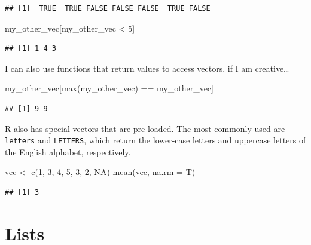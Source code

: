 \documentclass[
]{book}
\newenvironment{Shaded}{\begin{snugshade}}{\end{snugshade}}
\newcommand{\AttributeTok}[1]{\textcolor[rgb]{0.77,0.63,0.00}{#1}}
\newcommand{\ConstantTok}[1]{\textcolor[rgb]{0.00,0.00,0.00}{#1}}
\newcommand{\DecValTok}[1]{\textcolor[rgb]{0.00,0.00,0.81}{#1}}
\newcommand{\FunctionTok}[1]{\textcolor[rgb]{0.00,0.00,0.00}{#1}}
\newcommand{\NormalTok}[1]{#1}
\newcommand{\OtherTok}[1]{\textcolor[rgb]{0.56,0.35,0.01}{#1}}
\newcommand{\SpecialCharTok}[1]{\textcolor[rgb]{0.00,0.00,0.00}{#1}}
\begin{document}
\begin{verbatim}
## [1]  TRUE  TRUE FALSE FALSE FALSE  TRUE FALSE
\end{verbatim}

\begin{Shaded}
\begin{Highlighting}[]
\NormalTok{my\_other\_vec[my\_other\_vec }\SpecialCharTok{\textless{}} \DecValTok{5}\NormalTok{]}
\end{Highlighting}
\end{Shaded}

\begin{verbatim}
## [1] 1 4 3
\end{verbatim}

I can also use functions that return values to access vectors, if I am creative\ldots{}

\begin{Shaded}
\begin{Highlighting}[]
\NormalTok{my\_other\_vec[}\FunctionTok{max}\NormalTok{(my\_other\_vec) }\SpecialCharTok{==}\NormalTok{ my\_other\_vec]}
\end{Highlighting}
\end{Shaded}

\begin{verbatim}
## [1] 9 9
\end{verbatim}

R also has special vectors that are pre-loaded. The most commonly used are \texttt{letters} and \texttt{LETTERS}, which return the lower-case letters and uppercase letters of the English alphabet, respectively.

\begin{Shaded}
\begin{Highlighting}[]
\NormalTok{vec }\OtherTok{\textless{}{-}} \FunctionTok{c}\NormalTok{(}\DecValTok{1}\NormalTok{, }\DecValTok{3}\NormalTok{, }\DecValTok{4}\NormalTok{, }\DecValTok{5}\NormalTok{, }\DecValTok{3}\NormalTok{, }\DecValTok{2}\NormalTok{, }\ConstantTok{NA}\NormalTok{)}
\FunctionTok{mean}\NormalTok{(vec, }\AttributeTok{na.rm =}\NormalTok{ T)}
\end{Highlighting}
\end{Shaded}

\begin{verbatim}
## [1] 3
\end{verbatim}

\hypertarget{lists}{%
\section{Lists}\label{lists}}
\end{document}
